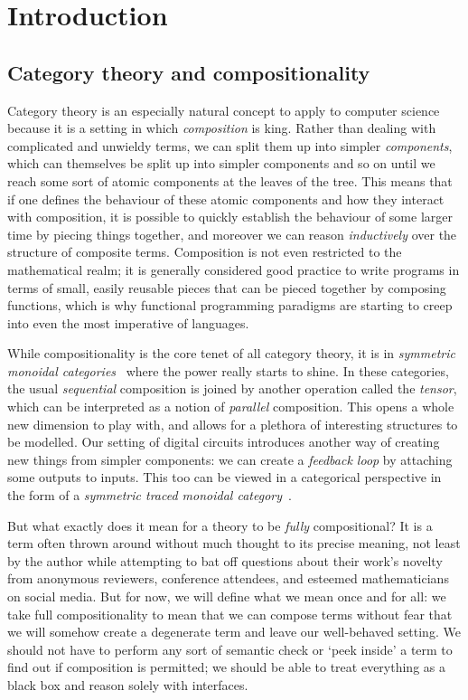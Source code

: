 \chapter{Introduction}




\section{Category theory and compositionality}

Category theory is an especially natural concept to apply to computer science
because it is a setting in which \emph{composition} is king.
Rather than dealing with complicated and unwieldy terms, we can split them
up into simpler \emph{components}, which can themselves be split up into simpler
components and so on until we reach some sort of atomic components at the leaves
of the tree.
This means that if one defines the behaviour of these atomic components and
how they interact with composition, it is possible to quickly establish the
behaviour of some larger time by piecing things together, and moreover we can
reason \emph{inductively} over the structure of composite terms.
Composition is not even restricted to the mathematical realm; it is generally
considered good practice to write programs in terms of small, easily reusable
pieces that can be pieced together by composing functions, which is why
functional programming paradigms are starting to creep into even the most
imperative of languages.

While compositionality is the core tenet of all category theory, it is in
\emph{symmetric monoidal categories}~\cite{maclane1963natural} where the power
really starts to shine.
In these categories, the usual \emph{sequential} composition is joined by
another operation called the \emph{tensor}, which can be interpreted as a notion
of \emph{parallel} composition.
This opens a whole new dimension to play with, and allows for a plethora of
interesting structures to be modelled.
Our setting of digital circuits introduces another way of creating new things
from simpler components: we can create a \emph{feedback loop} by attaching some
outputs to inputs.
This too can be viewed in a categorical perspective in the form of a
\emph{symmetric traced monoidal category}~\cite{joyal1996traced}.

But what exactly does it mean for a theory to be \emph{fully} compositional?
It is a term often thrown around without much thought to its precise meaning,
not least by the author while attempting to bat off questions about their work's
novelty from anonymous reviewers, conference attendees, and esteemed
mathematicians on social media.
But for now, we will define what we mean once and for all: we take full
compositionality to mean that we can compose terms without fear that we will
somehow create a degenerate term and leave our well-behaved setting.
We should not have to perform any sort of semantic check or `peek inside' a term
to find out if composition is permitted; we should be able to treat everything
as a black box and reason solely with interfaces.

